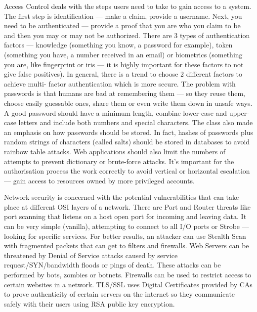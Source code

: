 \documentclass[a4paper]{article}
\begin{document}
Access Control deals with the steps users need to take to gain access to a
system. The first step is identification --- make a claim, provide a username.
Next, you need to be authenticated --- provide a proof that you are who you
claim to be and then you may or may not be authorized.
There are 3 types of authentication factors --- knowledge (something you know,
a password for example), token (something you have, a number received in
an email) or biometrics (something you are, like fingerprint or iris --- it is
highly important for these factors to not give false positives).
In general, there is a trend to choose 2 different factors to achieve multi-
factor authentication which is more secure. The problem with passwords
is that humans are bad at remembering them --- so they reuse them,
choose easily guessable ones, share them or even write them down in unsafe
ways. A good password should have a minimum length, combine lower-case and
upper-case letters and include both numbers and special characters. The class
also made an emphasis on how passwords should be stored. In fact, hashes of
passwords plus random strings of characters (called salts) should be stored in
databases to avoid rainbow table attacks. Web applications should also limit
the numbers of attempts to prevent dictionary or brute-force attacks. It's
important for the authorisation process the work correctly to avoid vertical
or horizontal escalation --- gain access to resources owned by more privileged
accounts.

Network security is concerned with the potential vulnerabilities that can take
place at different OSI layers of a network. There are Port and Router threats
like port scanning that listens on a host open port for incoming and leaving
data. It can be very simple (vanilla), attempting to connect to all I/O ports
or Strobe --- looking for specific services. For better results, an attacker
can use Stealth Scan with fragmented packets that can get to filters and
firewalls.
Web Servers can be threatened by Denial of Service attacks caused by
service request/SYN/bandwidth floods or pings of death. These attacks can
be performed by bots, zombies or botnets.
Firewalls can be used to restrict access to certain websites in a network.
TLS/SSL uses Digital Certificates provided by CAs to prove authenticity of
certain servers on the internet so they communicate safely with their users
using RSA public key encryption.
\end{document}
